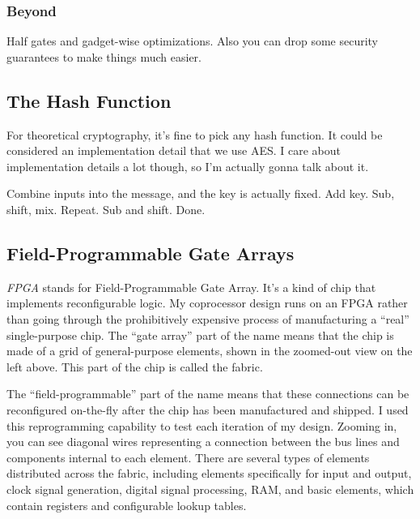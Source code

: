 \subsubsection{Beyond}
Half gates and gadget-wise optimizations. Also you can drop some security guarantees to make things much easier.

\subsection{The Hash Function}
For theoretical cryptography, it's fine to pick any hash function. It could be considered an implementation detail that we use AES. I care about implementation details a lot though, so I'm actually gonna talk about it.

Combine inputs into the message, and the key is actually fixed. Add key. Sub, shift, mix. Repeat. Sub and shift. Done.

\subsection{Field-Programmable Gate Arrays}
\textit{FPGA} stands for Field-Programmable Gate Array. It's a kind of chip that implements reconfigurable logic. My coprocessor design runs on an FPGA rather than going through the prohibitively expensive process of manufacturing a ``real'' single-purpose chip. The ``gate array'' part of the name means that the chip is made of a grid of general-purpose elements, shown in the zoomed-out view on the left above. This part of the chip is called the fabric.

The ``field-programmable'' part of the name means that these connections can be reconfigured on-the-fly after the chip has been manufactured and shipped. I used this reprogramming capability to test each iteration of my design. Zooming in, you can see diagonal wires representing a connection between the bus lines and components internal to each element. There are several types of elements distributed across the fabric, including elements specifically for input and output, clock signal generation, digital signal processing, RAM, and basic elements, which contain registers and configurable lookup tables.

